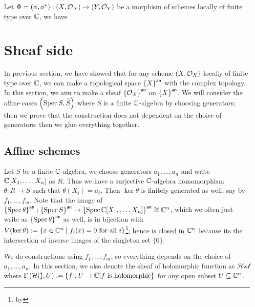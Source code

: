 \begin{corollary}
	Let $\Phi = (\phi, \phi^{*}) : \left(X, \mathcal{O}_{X}\right) \to \left(Y, \mathcal{O}_{Y}\right)$ be a morphism of schemes locally of finite type over $\mathbb{C}$, we have
	\begin{center}
	\end{center}
\end{corollary}


\section{Sheaf side}

In previous section, we have showed that for any scheme $\left(X, \mathcal{O}_{X}\right)$ locally of finite type over $\mathbb{C}$, we can make a topological space ${\left\{{X}\right\}}^{\mathsf{an}}$ with the complex topology. In this section, we aim to make a sheaf ${\left\{{\mathcal{O}_{X}}\right\}}^{\mathsf{an}}$ on ${\left\{{X}\right\}}^{\mathsf{an}}$. We will consider the affine cases $\left(\operatorname*{Spec}{S}, \widetilde{S}\right)$ where $S$ is a finite $\mathbb{C}$-algebra by choosing generators; then we prove that the construction does not dependent on the choice of generators; then we glue everything together.

\subsection{Affine schemes}
Let $S$ be a finite $\mathbb{C}$-algebra, we choose generators $a_{1},\dots, a_{n}$ and write $\mathbb{C}[X_{1},\dots,X_{n}]$ as $R$. Thus we have a surjective $\mathbb{C}$-algebra homomorphism $\theta: R \to S$ such that $\theta(X_{i}) = a_{i}$. Then $\ker\theta$ is finitely generated as well, say by $f_{1},\dots,f_{m}$.
Note that the image of ${\left\{{\operatorname{Spec}\theta}\right\}}^{\mathsf{an}}:{\left\{{\operatorname{Spec} S}\right\}}^{\mathsf{an}}\to{\left\{{\ensuremath{\operatorname{Spec}}\ensuremath{\mathbb{C}}[X_{1},\dots, X_{n}]}\right\}}^{\mathsf{an}}\cong \mathbb{C}^{n}$, which we often just write as ${\left\{{\operatorname{Spec}\theta}\right\}}^{\mathsf{an}}$ as well, is in bijection with $V(\ker\theta) := \{x \in \mathbb{C}^{n}\mid f_{i}(x) = 0~\text{for all}~i\}$\footnote{by }; hence is closed in $\mathbb{C}^{n}$ because its the intersection of inverse images of the singleton set $\{0\}$.

We do constructions using $f_{1},\dots, f_{m}$, so everything depends on the choice of $a_{1},\dots,a_{n}$. In this section, we also denote the sheaf of holomorphic function as $\mathcal{Hol}$ where ${\Gamma\left(\mathcal{Hol},U\right)} := \{f : U \to \mathbb{C} | f~\text{is holomorphic}\}$ for any open subset $U \subseteq \mathbb{C}^{n}$.

